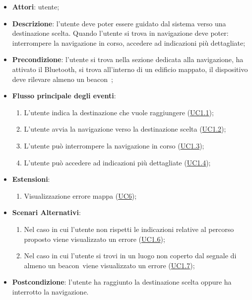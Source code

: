 \documentclass[../AnalisiDeiRequisiti.tex]{subfiles}
\begin{document}
\begin{itemize}
\item \textbf{Attori}: utente;
\item \textbf{Descrizione}: l'utente deve poter essere guidato dal sistema verso una destinazione scelta. Quando l'utente si trova in navigazione deve poter: interrompere la navigazione in corso, accedere ad indicazioni più dettagliate; 
      \item \textbf{Precondizione}: l'utente si trova nella sezione dedicata alla navigazione, ha attivato il Bluetooth\g, si trova all'interno di un edificio mappato\g, il dispositivo deve rilevare almeno un beacon\g\ 
;

        \item \textbf{Flusso principale degli eventi}:
          \begin{enumerate}
          \item L'utente indica la destinazione che vuole raggiungere (\hyperlink{UC1.1}{UC1.1});
          \item L'utente avvia la navigazione verso la destinazione scelta (\hyperlink{UC1.2}{UC1.2});
          \item L'utente può interrompere la navigazione in corso  (\hyperlink{UC1.3}{UC1.3});
          \item L'utente può accedere ad indicazioni più dettagliate  (\hyperlink{UC1.4}{UC1.4});

      \end{enumerate}
    \item \textbf{Estensioni}:
      \begin{enumerate}
          \item Visualizzazione errore mappa (\hyperlink{UC6}{UC6});

      \end{enumerate}
    \item \textbf{Scenari Alternativi}:
      \begin{enumerate}
          \item Nel caso in cui l'utente non rispetti le indicazioni relative al percorso proposto viene visualizzato un errore (\hyperlink{UC1.6}{UC1.6});
          \item Nel caso in cui l'utente si trovi in un luogo non coperto dal segnale di almeno un beacon\g\ viene visualizzato un errore (\hyperlink{UC1.7}{UC1.7});

      \end{enumerate}
    \item \textbf{Postcondizione}: l'utente ha raggiunto la destinazione scelta oppure ha interrotto la navigazione.
  \end{itemize}
\hypertarget{UC1.1}{}
\end{document}
